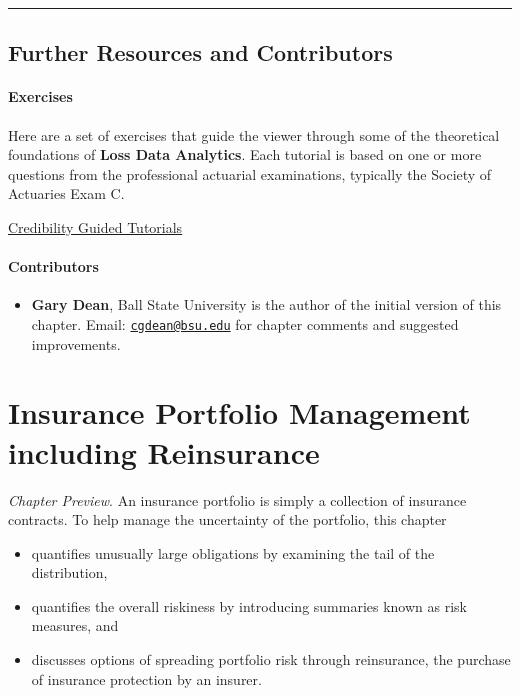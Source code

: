 \documentclass[]{book}
\providecommand{\tightlist}{%
  \setlength{\itemsep}{0pt}\setlength{\parskip}{0pt}}
\theoremstyle{definition}
\theoremstyle{definition}
\theoremstyle{definition}
\theoremstyle{remark}
\begin{document}
\begin{center}\rule{0.5\linewidth}{\linethickness}\end{center}

\section{Further Resources and
Contributors}\label{Cred-further-reading-and-resources}

\subsubsection*{Exercises}\label{exercises-5}

Here are a set of exercises that guide the viewer through some of the
theoretical foundations of \textbf{Loss Data Analytics}. Each tutorial
is based on one or more questions from the professional actuarial
examinations, typically the Society of Actuaries Exam C.

\href{https://www.ssc.wisc.edu/~jfrees/loss-data-analytics/loss-data-analyticscredibility-guided-tutorials/}{Credibility
Guided Tutorials}

\subsubsection*{Contributors}\label{contributors-5}

\begin{itemize}
\tightlist
\item
  \textbf{Gary Dean}, Ball State University is the author of the initial
  version of this chapter. Email:
  \href{mailto:cgdean@bsu.edu}{\nolinkurl{cgdean@bsu.edu}} for chapter
  comments and suggested improvements.
\end{itemize}

\chapter{Insurance Portfolio Management including
Reinsurance}\label{C:PortMgt}

\emph{Chapter Preview}. An insurance portfolio is simply a collection of
insurance contracts. To help manage the uncertainty of the portfolio,
this chapter

\begin{itemize}
\tightlist
\item
  quantifies unusually large obligations by examining the tail of the
  distribution,
\item
  quantifies the overall riskiness by introducing summaries known as
  risk measures, and
\item
  discusses options of spreading portfolio risk through reinsurance, the
  purchase of insurance protection by an insurer.
\end{itemize}
\end{document}
